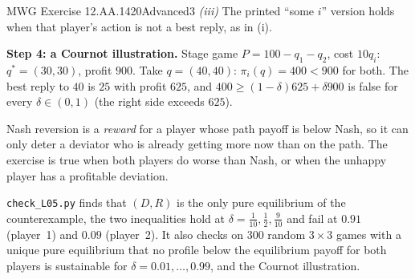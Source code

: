 \begin{exsol}{MWG Exercise 12.AA.1}{420}{Advanced}{3}
\emph{(iii)} The printed ``some $i$'' version holds when that player's action is not a best reply, as in (i).

\textbf{Step 4: a Cournot illustration.} Stage game $P = 100 - q_1 - q_2$, cost $10q_i$: $q^* = (30,30)$, profit $900$.
Take $q = (40,40)$: $\pi_i(q) = 400 < 900$ for both. The best reply to $40$ is $25$ with profit $625$, and
$400 \ge (1-\delta)625 + \delta 900$ is false for every $\delta \in (0,1)$ (the right side exceeds $625$).

\interp Nash reversion is a \emph{reward} for a player whose path payoff is below Nash, so it can only deter
a deviator who is already getting more now than on the path. The exercise is true when both players do worse
than Nash, or when the unhappy player has a profitable deviation.

\verify \texttt{check\_L05.py} finds that $(D,R)$ is the only pure equilibrium of the counterexample, the two
inequalities hold at $\delta = \frac1{10}, \frac12, \frac9{10}$ and fail at $0.91$ (player~1) and $0.09$ (player~2). It also
checks on 300 random $3\times3$ games with a unique pure equilibrium that no profile below the equilibrium
payoff for both players is sustainable for $\delta = 0.01, \dots, 0.99$, and the Cournot illustration.

\end{exsol}

